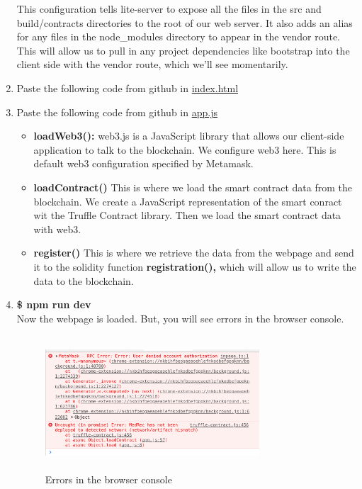 \documentclass[journal,12pt,twocolumn]{IEEEtran}
\begin{document}
\begin{enumerate}
  This configuration tells lite-server to expose all the files in the src and build/contracts directories to the root of our web server. It also adds an alias for any files in the node\_modules directory to appear in the vendor route. This will allow us to pull in any project dependencies like bootstrap into the client side with the vendor route, which we'll see momentarily.
  
  \item Paste the following code from github in \href{https://github.com/vinnoo/healthcare/blob/master/VendorNode/Projects/healthcare/src/index.html}{index.html}
  \item Paste the following code from github in \href{https://github.com/vinnoo/healthcare/blob/master/VendorNode/Projects/healthcare/src/app.js}{app.js}
  
  \begin{itemize}
      \item \textbf{loadWeb3():} web3.js is a JavaScript library that allows our client-side application to talk to the blockchain. We configure web3 here. This is default web3 configuration specified by Metamask.
      
      \item \textbf{loadContract()} This is where we load the smart contract data from the blockchain. We create a JavaScript representation of the smart conract wit the Truffle Contract library. Then we load the smart contract data with web3.
      
      \item \textbf{register()} This is where we retrieve the data from the webpage and send it to the solidity function \textbf{registration(),} which will allow us to write the data to the blockchain.
  \end{itemize}
  
  \item \textbf{\$ npm run dev}\\
  Now the webpage is loaded. But, you will see errors in the browser console.\\
  \begin{figure}[H]
  \includegraphics[width=8cm, height=5cm]{error.png}
  \caption{Errors in the browser console}
  \label{fig:10}
  \end{figure}
  

\end{enumerate}
\end{document}
